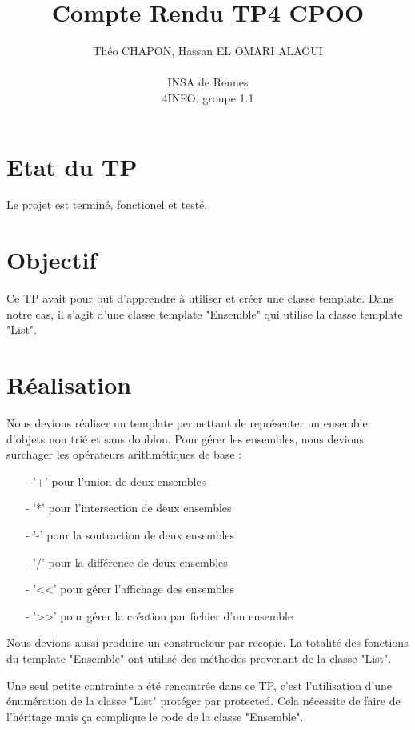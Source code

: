 \documentclass[a4paper,12pt]{article}
\author{
  Théo \textsc{CHAPON}, Hassan \textsc{EL OMARI ALAOUI} \\ \\
  INSA de Rennes \\
  4INFO, groupe 1.1
}
\title{Compte Rendu TP4 CPOO}
\begin{document}

\section{Etat du TP}

Le projet est terminé, fonctionel et testé.


\section{Objectif}

Ce TP avait pour but d'apprendre à utiliser et créer une classe template. Dans notre cas, il s'agit d'une classe template "Ensemble" qui utilise la classe template "List".


\section{Réalisation}

Nous devions réaliser un template permettant de représenter un ensemble d'objets non trié et sans doublon. Pour gérer les ensembles, nous devions surchager les opérateurs arithmétiques de base : 
\begin{itemize}
\item[-] '+' pour l'union de deux ensembles
\item[-] '*' pour l'intersection de deux ensembles
\item[-] '-' pour la soutraction de deux ensembles
\item[-] '/' pour la différence de deux ensembles
\item[-] '<<' pour gérer l'affichage des ensembles
\item[-] '>>' pour gérer la création par fichier d'un ensemble
\end{itemize}
    
Nous devions aussi produire un constructeur par recopie. La totalité des fonctions du template "Ensemble" ont utilisé des méthodes provenant de la classe "List". 

\vspace{1cm}

Une seul petite contrainte a été rencontrée dans ce TP, c'est l'utilisation d'une énumération de la classe "List" protéger par protected. Cela nécessite de faire de l'héritage mais ça complique le code de la classe "Ensemble".



\end{document}
